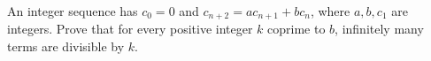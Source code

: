 An integer sequence has $c_0=0$ and $c_{n+2}=ac_{n+1}+bc_n$, where $a,b,c_1$ are integers. Prove that for every positive integer $k$ coprime to $b$, infinitely many terms are divisible by $k$.
